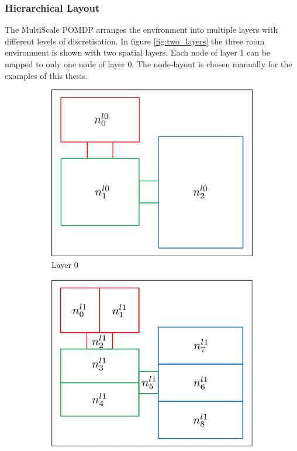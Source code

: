 \subsubsection{Hierarchical Layout}
The MultiScale POMDP arranges the environment into multiple layers with different levels of discretisation. In figure \ref{fig:two_layers} the three room environment is shown with two spatial layers. Each node of layer 1 can be mapped to only one node of layer 0. The node-layout is chosen manually for the examples of this thesis. 
\begin{figure}
    \centering
    \begin{subfigure}[b]{0.48\textwidth}
        \includegraphics[width=\textwidth]{Report/images/layer0_b.png}
        \caption[t]{Layer 0}
        \label{subfig:l0}
    \end{subfigure}
    \hfill
    \begin{subfigure}[b]{0.48\textwidth}
        \includegraphics[width=\textwidth]{Report/images/layer1.png}

\end{subfigure}
\end{figure}
